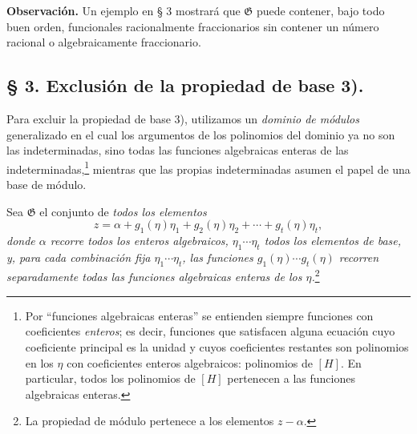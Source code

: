 \documentclass[11pt]{article}
\begin{document}
\textbf{Observación.} Un ejemplo en § 3 mostrará que $\mathfrak G$ puede contener, bajo todo buen orden, funcionales racionalmente fraccionarios sin contener un número racional o algebraicamente fraccionario.

\subsection*{§ 3. Exclusión de la propiedad de base 3).}

Para excluir la propiedad de base 3), utilizamos un \emph{dominio de módulos} generalizado en el cual los argumentos de los polinomios del dominio ya no son las indeterminadas, sino todas las funciones algebraicas enteras de las indeterminadas,\footnote{Por ``funciones algebraicas enteras'' se entienden siempre funciones con coeficientes \emph{enteros}; es decir, funciones que satisfacen alguna ecuación cuyo coeficiente principal es la unidad y cuyos coeficientes restantes son polinomios en los $\eta$ con coeficientes enteros algebraicos: polinomios de $[H]$. En particular, todos los polinomios de $[H]$ pertenecen a las funciones algebraicas enteras.} mientras que las propias indeterminadas asumen el papel de una base de módulo.

Sea $\mathfrak G$ el conjunto de \emph{todos los elementos}
\begin{equation}
 z=\alpha+g_1(\eta)\eta_1+g_2(\eta)\eta_2+\cdots+g_t(\eta)\eta_t,
\tag{1}
\end{equation}
\emph{donde $\alpha$ recorre todos los enteros algebraicos, $\eta_1\cdots\eta_t$ todos los elementos de base, y, para cada combinación fija $\eta_1\cdots\eta_t$, las funciones $g_1(\eta)\cdots g_t(\eta)$ recorren separadamente todas las funciones algebraicas enteras de los $\eta$.}\footnote{La propiedad de módulo pertenece a los elementos $z-\alpha$.}
\end{document}
